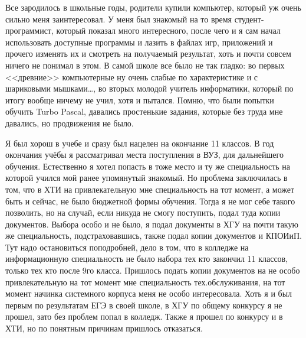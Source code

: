 Все  зародилось в школьные годы, родители купили компьютер, который уж очень сильно меня заинтересовал. У меня был знакомый на то время студент-программист, который показал много интересного, после чего и я сам начал использовать доступные программы и лазить в файлах игр, приложений  и прочего изменять их и смотреть на получаемый результат, хоть и почти совсем ничего не понимал в этом. В самой школе все было не так гладко: во первых <<древние>> компьютерные ну очень слабые по характеристике и с шариковыми мышками…, во вторых молодой учитель информатики, который по итогу вообще ничему не учил, хотя и пытался. Помню, что были попытки обучить Turbo Pascal,  давались простенькие задания, которые без труда мне давались, но продвижения не было.

Я был хорош в учебе и сразу был нацелен на окончание 11 классов. В год окончания учёбы я рассматривал места поступления в ВУЗ, для дальнейшего обучения. Естественно я хотел попасть в тоже место и ту же специальность на которой учился мой ранее упомянутый знакомый. Но проблема заключилась в том, что в ХТИ на привлекательную мне специальность на тот момент, а может быть и сейчас, не было бюджетной формы обучения. Тогда я не мог себе такого позволить, но на случай, если никуда не смогу поступить, подал туда копии документов. Выбора особо и не было, я подал документы в ХГУ на почти такую же специальность, подстраховавшись, также подал копии документов и КПОИиП. Тут надо остановиться поподробней, дело в том, что в колледже на информационную специальность не было набора тех кто закончил 11 классов, только тех кто после 9го класса. Пришлось подать копии документов на не особо привлекательную на тот момент мне специальность тех.обслуживания, на тот момент начинка системного корпуса меня не особо интересовала.  Хоть я и был первым по результатам ЕГЭ в своей школе, в ХГУ по общему конкурсу я не прошел, зато без проблем попал в колледж. Также я прошел по конкурсу и в ХТИ, но по понятным причинам пришлось отказаться.

